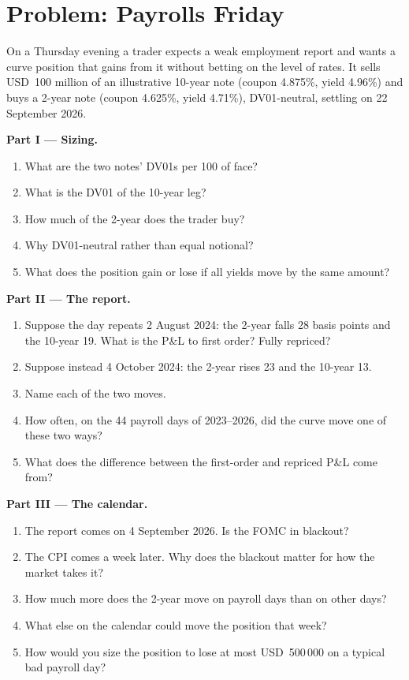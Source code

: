 \section{Problem: Payrolls Friday}

\begin{problem}\label{pb:m2:reading-a-macro-calendar-and-a-rates-screen:1}
On a Thursday evening a trader expects a weak employment report and wants a curve position
that gains from it without betting on the level of rates. It sells USD~100 million of an
illustrative 10-year note (coupon 4.875\%, yield 4.96\%) and buys a 2-year note (coupon
4.625\%, yield 4.71\%), DV01-neutral, settling on 22 September 2026.

\medskip\noindent\textbf{Part I --- Sizing.}
\begin{enumerate}
\item What are the two notes' DV01s per 100 of face?
\item What is the DV01 of the 10-year leg?
\item How much of the 2-year does the trader buy?
\item Why DV01-neutral rather than equal notional?
\item What does the position gain or lose if all yields move by the same amount?
\end{enumerate}

\medskip\noindent\textbf{Part II --- The report.}
\begin{enumerate}[resume]
\item Suppose the day repeats 2 August 2024: the 2-year falls 28 basis points and the 10-year
19. What is the P\&L to first order? Fully repriced?
\item Suppose instead 4 October 2024: the 2-year rises 23 and the 10-year 13.
\item Name each of the two moves.
\item How often, on the 44 payroll days of 2023--2026, did the curve move one of these two
ways?
\item What does the difference between the first-order and repriced P\&L come from?
\end{enumerate}

\medskip\noindent\textbf{Part III --- The calendar.}
\begin{enumerate}[resume]
\item The report comes on 4 September 2026. Is the FOMC in blackout?
\item The CPI comes a week later. Why does the blackout matter for how the market takes it?
\item How much more does the 2-year move on payroll days than on other days?
\item What else on the calendar could move the position that week?
\item How would you size the position to lose at most USD~500\,000 on a typical bad payroll
day?
\end{enumerate}


\end{problem}
